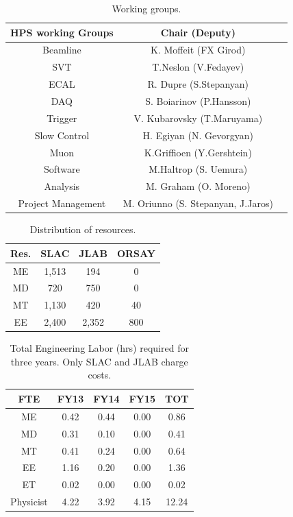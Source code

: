 \begin{table}[htdp]
\caption{Working groups.}
\begin{center}
\begin{tabular}{|c|c|c|}
\hline
HPS working Groups	& Chair (Deputy)\\
\hline\hline
Beamline	&K. Moffeit (FX Girod)\\
\hline
SVT	&T.Neslon (V.Fedayev)\\
\hline
ECAL	& R. Dupre (S.Stepanyan)\\
\hline
DAQ	 & S. Boiarinov (P.Hansson)\\
\hline
Trigger &	V. Kubarovsky (T.Maruyama)\\
\hline
Slow Control	& H. Egiyan (N. Gevorgyan)\\
\hline
Muon &	K.Griffioen (Y.Gershtein)\\
\hline
Software	& M.Haltrop (S. Uemura)\\
\hline
Analysis &	M. Graham (O. Moreno)\\
\hline
Project Management &	M. Oriunno (S. Stepanyan, J.Jaros)\\
\hline
\end{tabular}
\end{center}
\label{tb:groups}
\end{table}%

\begin{table}[htdp]
\caption{Distribution of resources.}
\begin{center}
\begin{tabular}{c|ccc}
Res.	 &SLAC	&JLAB	&ORSAY\\
\hline\hline
ME	&1,513	&194	&0 \\
MD	&720	&750	&0\\
MT	&1,130	&420	&40\\
EE 	&2,400	&2,352&	800\\
\end{tabular}
\end{center}
\label{tb:resources}
\end{table}%

\begin{table}[htdp]
\caption{Total Engineering Labor (hrs) required for three years. Only SLAC and JLAB charge costs.}
\begin{center}
\begin{tabular}{c|cccc}
 FTE	&FY13	&FY14	&FY15&	TOT\\
 \hline\hline
ME	&0.42	&0.44&	0.00&	0.86\\
MD&	0.31	&0.10&	0.00&	0.41\\
MT&	0.41	&0.24&	0.00	&0.64\\
EE &	1.16	&0.20&	0.00	&1.36\\
ET&	0.02	&0.00&	0.00	&0.02\\
Physicist	&4.22	&3.92	&4.15	&12.24\\
\end{tabular}
\end{center}
\label{tb:engin}
\end{table}%

